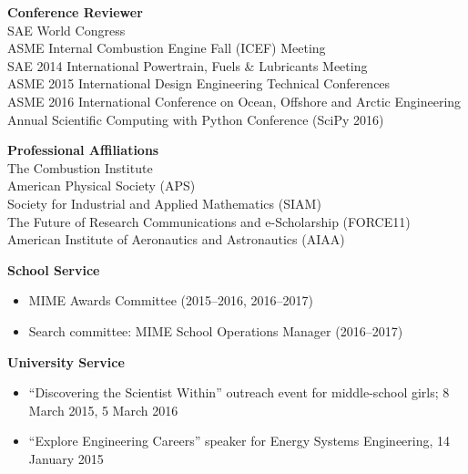\documentclass[margin,line,11pt]{res}
\begin{document}
\begin{resume}
\textbf{Conference Reviewer} \\
SAE World Congress\\
ASME Internal Combustion Engine Fall (ICEF) Meeting\\
SAE 2014 International Powertrain, Fuels \& Lubricants Meeting \\
ASME 2015 International Design Engineering Technical Conferences \\
ASME 2016  International Conference on Ocean, Offshore and Arctic Engineering \\
 Annual Scientific Computing with Python Conference (SciPy 2016)

\textbf{Professional Affiliations} \\
The Combustion Institute \\
American Physical Society (APS) \\
Society for Industrial and Applied Mathematics (SIAM) \\
The Future of Research Communications and e-Scholarship (FORCE11) \\
American Institute of Aeronautics and Astronautics (AIAA)

\textbf{School Service}
\begin{itemize}[leftmargin=*]
    \item MIME Awards Committee (2015--2016, 2016--2017)
    \item Search committee: MIME School Operations Manager (2016--2017)
\end{itemize}

\textbf{University Service}
\begin{itemize}[leftmargin=*]
\item ``Discovering the Scientist Within'' outreach event for middle-school girls; 8 March 2015, 5 March 2016
\item ``Explore Engineering Careers'' speaker for Energy Systems Engineering, 14 January 2015
\end{itemize}


\end{resume}
\end{document}
